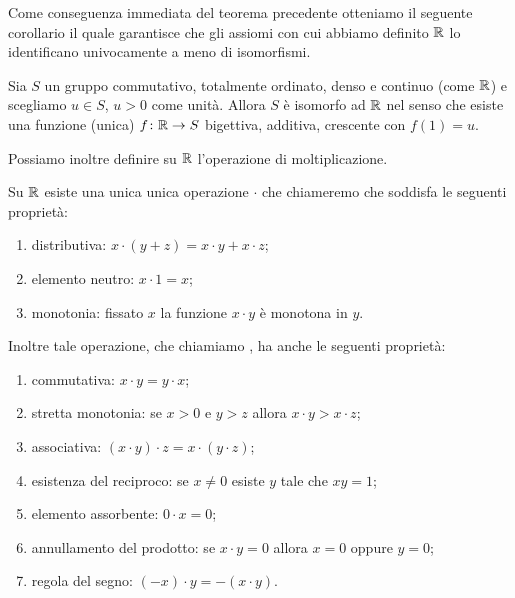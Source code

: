 Come conseguenza immediata del teorema precedente otteniamo il seguente corollario il quale
garantisce che gli assiomi con cui abbiamo definito $\RR$
lo identificano univocamente a meno di isomorfismi.

\begin{corollary}[unicità di $\RR$]%
  \label{th:unicitaR}%
  Sia $S$ un gruppo commutativo, totalmente ordinato, denso e continuo (come $\RR$)
  e scegliamo $u\in S$, $u>0$ come unità.
  Allora $S$ è isomorfo ad $\RR$ nel senso che esiste una funzione (unica)
  $f\colon {\mathbb R}\to S$ bigettiva, additiva, crescente con $f(1)=u$.
\end{corollary}

%
Possiamo inoltre definire su $\RR$ l'operazione di moltiplicazione.
%
\begin{theorem}[moltiplicazione]
Su $\RR$ esiste una unica unica operazione $\cdot$ che chiameremo 
 che soddisfa le seguenti 
proprietà: 
\begin{enumerate}
  \item distributiva: $x\cdot(y+z) = x\cdot y + x\cdot z$;
  \item elemento neutro: $x\cdot 1 = x$;
  \item monotonia: fissato $x$ la funzione $x\cdot y$ è monotona in $y$.  
\end{enumerate}
  Inoltre tale operazione, che chiamiamo ,
  ha anche le seguenti proprietà:
\begin{enumerate}
  \item commutativa: $x\cdot y = y\cdot x$;
  \item stretta monotonia: se $x>0$ e $y>z$ allora $x\cdot y > x \cdot z$;
  \item associativa: $(x\cdot y)\cdot z = x \cdot (y\cdot z)$;
  \item esistenza del reciproco: se $x\neq 0$ esiste $y$ tale 
  che $xy = 1$;
  \item elemento assorbente: $0\cdot x = 0$;
  \item annullamento del prodotto: se $x\cdot y=0$ allora $x=0$ oppure $y=0$;
  \item regola del segno: $(-x)\cdot y = -(x\cdot y)$.
\end{enumerate}
\end{theorem}
